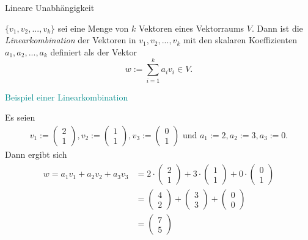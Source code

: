 \documentclass[
  8pt,
  ignorenonframetext,
]{beamer}
\begin{document}
\begin{frame}{Lineare Unabhängigkeit}
\protect\hypertarget{lineare-unabhuxe4ngigkeit}{}
\vspace{3mm}
\small
\begin{definition}[Linearkombination]
\justifying
$\{v_1, v_2, ..., v_k\}$ sei eine Menge von $k$ Vektoren eines Vektorraums $V$.
Dann ist die \textit{Linearkombination} der Vektoren in $v_1, v_2, ..., v_k$ mit den
skalaren Koeffizienten $a_1, a_2,...,a_k$ definiert als der Vektor
\begin{equation}
w := \sum_{i=1}^k a_i v_i \in V.
\end{equation}
\end{definition}

\textcolor{darkcyan}{Beispiel einer Linearkombination}

\footnotesize

Es seien \begin{align*}
v_1 := \begin{pmatrix} 2 \\ 1 \end{pmatrix},
v_2 := \begin{pmatrix} 1 \\ 1 \end{pmatrix},
v_3 := \begin{pmatrix} 0 \\ 1 \end{pmatrix}
\mbox{ und }
a_1 := 2, a_2 := 3, a_3 := 0.
\end{align*} Dann ergibt sich \begin{align*}
\begin{split}
w
  = a_1v_1 + a_2v_2 + a_3v_3
& =  2 \cdot \begin{pmatrix} 2 \\ 1 \end{pmatrix}
   + 3 \cdot \begin{pmatrix} 1 \\ 1 \end{pmatrix}
   + 0 \cdot \begin{pmatrix} 0 \\ 1 \end{pmatrix}   \\
& =   \begin{pmatrix} 4 \\ 2 \end{pmatrix}
    + \begin{pmatrix} 3 \\ 3 \end{pmatrix}
    + \begin{pmatrix} 0 \\ 0 \end{pmatrix}   \\
& =   \begin{pmatrix} 7 \\ 5 \end{pmatrix}
\end{split}
\end{align*}
\end{frame}
\end{document}
